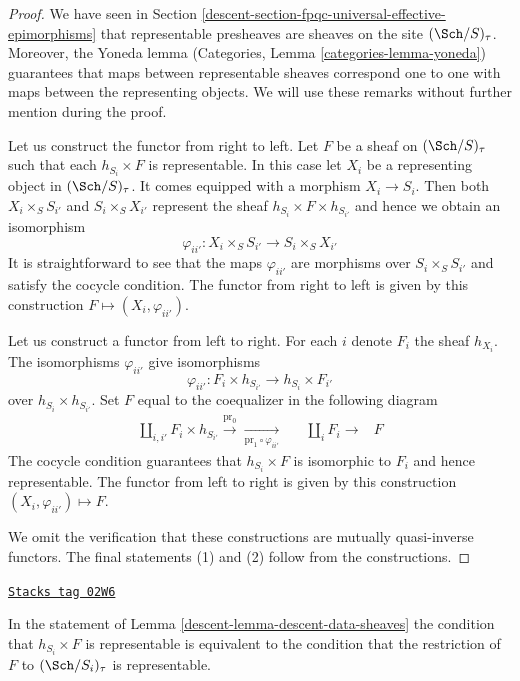\begin{proof}
We have seen in Section \ref{descent-section-fpqc-universal-effective-epimorphisms}
that representable presheaves are sheaves on the site $(\Sch/S)_\tau$.
Moreover, the Yoneda lemma (Categories, Lemma \ref{categories-lemma-yoneda})
guarantees that maps between representable
sheaves correspond one to one with maps between the representing objects.
We will use these remarks without further mention during the proof.

\medskip\noindent
Let us construct the functor from right to left.
Let $F$ be a sheaf on $(\Sch/S)_\tau$ such that each
$h_{S_i} \times F$ is representable. In this case let $X_i$
be a representing object in $(\Sch/S)_\tau$.
It comes equipped with a morphism $X_i \to S_i$.
Then both $X_i \times_S S_{i'}$ and $S_i \times_S X_{i'}$
represent the sheaf $h_{S_i} \times F \times h_{S_{i'}}$
and hence we obtain an isomorphism
$$
\varphi_{ii'} : X_i \times_S S_{i'} \to S_i \times_S X_{i'}
$$
It is straightforward to see that the maps $\varphi_{ii'}$
are morphisms over $S_i \times_S S_{i'}$ and satisfy the
cocycle condition. The functor from right to left is given
by this construction $F \mapsto (X_i, \varphi_{ii'})$.

\medskip\noindent
Let us construct a functor from left to right.
For each $i$ denote $F_i$ the sheaf $h_{X_i}$.
The isomorphisms $\varphi_{ii'}$ give isomorphisms
$$
\varphi_{ii'} :
F_i \times h_{S_{i'}}
\longrightarrow
h_{S_i} \times F_{i'}
$$
over $h_{S_i} \times h_{S_{i'}}$.
Set $F$ equal to the coequalizer in the following diagram
$$
\begin{array}{cccc}\coprod_{i, i'} F_i \times h_{S_{i'}}
\overset{\text{pr}_0}{\longrightarrow}\underset{\text{pr}_1 \circ \varphi_{ii'}}{\longrightarrow} &  & \coprod_i F_i \longrightarrow & F\end{array}
$$
The cocycle condition guarantees that $h_{S_i} \times F$ is
isomorphic to $F_i$ and hence representable.
The functor from left to right is given
by this construction $(X_i, \varphi_{ii'}) \mapsto F$.

\medskip\noindent
We omit the verification that these constructions
are mutually quasi-inverse functors. The final statements
(1) and (2) follow from the constructions.
\end{proof}

\begin{remark}
\label{descent-remark-what-product-means}
\href{https://stacks.math.columbia.edu/tag/02W6}{\texttt{Stacks tag 02W6}}

In the statement of Lemma \ref{descent-lemma-descent-data-sheaves} the condition that
$h_{S_i} \times F$ is representable is equivalent to
the condition that the restriction of $F$ to
$(\Sch/S_i)_\tau$ is representable.
\end{remark}



